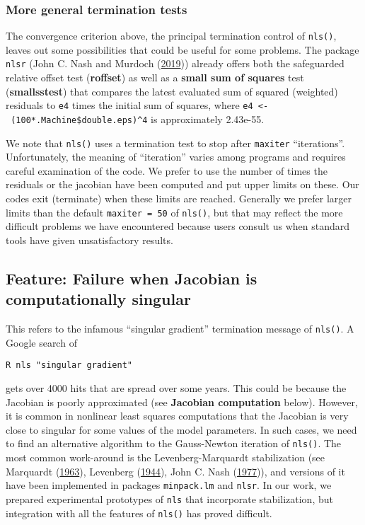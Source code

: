 \documentclass[
]{article}
\begin{document}
\hypertarget{more-general-termination-tests}{%
\subsubsection{More general termination
tests}\label{more-general-termination-tests}}

The convergence criterion above, the principal termination control of
\texttt{nls()}, leaves out some possibilities that could be useful for
some problems. The package \texttt{nlsr} (John C. Nash and Murdoch
(\protect\hyperlink{ref-nlsr-manual}{2019})) already offers both the
safeguarded relative offset test (\textbf{roffset}) as well as a
\textbf{small sum of squares} test (\textbf{smallsstest}) that compares
the latest evaluated sum of squared (weighted) residuals to \texttt{e4}
times the initial sum of squares, where
\texttt{e4\ \textless{}-\ (100*.Machine\$double.eps)\^{}4} is
approximately 2.43e-55.

We note that \texttt{nls()} uses a termination test to stop after
\texttt{maxiter} ``iterations''. Unfortunately, the meaning of
``iteration'' varies among programs and requires careful examination of
the code. We prefer to use the number of times the residuals or the
jacobian have been computed and put upper limits on these. Our codes
exit (terminate) when these limits are reached. Generally we prefer
larger limits than the default \texttt{maxiter\ =\ 50} of
\texttt{nls()}, but that may reflect the more difficult problems we have
encountered because users consult us when standard tools have given
unsatisfactory results.

\hypertarget{feature-failure-when-jacobian-is-computationally-singular}{%
\subsection{Feature: Failure when Jacobian is computationally
singular}\label{feature-failure-when-jacobian-is-computationally-singular}}

This refers to the infamous ``singular gradient'' termination message of
\texttt{nls()}. A Google search of

\begin{verbatim}
R nls "singular gradient"
\end{verbatim}

gets over 4000 hits that are spread over some years. This could be
because the Jacobian is poorly approximated (see \textbf{Jacobian
computation} below). However, it is common in nonlinear least squares
computations that the Jacobian is very close to singular for some values
of the model parameters. In such cases, we need to find an alternative
algorithm to the Gauss-Newton iteration of \texttt{nls()}. The most
common work-around is the Levenberg-Marquardt stabilization (see
Marquardt (\protect\hyperlink{ref-Marquardt1963}{1963}), Levenberg
(\protect\hyperlink{ref-Levenberg1944}{1944}), John C. Nash
(\protect\hyperlink{ref-jn77ima}{1977})), and versions of it have been
implemented in packages \texttt{minpack.lm} and \texttt{nlsr}. In our
work, we prepared experimental prototypes of \texttt{nls} that
incorporate stabilization, but integration with all the features of
\texttt{nls()} has proved difficult.
\end{document}
